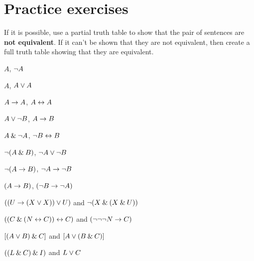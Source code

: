 
\section{Practice exercises}
\setcounter{ProbPart}{0}


\problempart
\label{pr.TT.equiv3}
If it is possible, use a partial truth table to show that the pair of sentences are \textbf{not equivalent}. If it can't be shown that they are not equivalent, then create a full truth table showing that they are equivalent. 
\begin{earg}
\item $A$, ${\neg} A$ %
\item $A$, $A \vee A$ %
\item $A\rightarrow A$, $A \leftrightarrow A$ %
\item $A \vee {\neg} B$, $A\rightarrow B$ %
\item $A \mathbin{\&} {\neg} A$, ${\neg} B \leftrightarrow B$ %
\item ${\neg}(A \mathbin{\&} B)$, ${\neg} A \vee {\neg} B$ %
\item ${\neg}(A \rightarrow B)$, ${\neg} A \rightarrow {\neg} B$ %
\item $(A \rightarrow B)$, $({\neg} B \rightarrow {\neg} A)$ %
\item $ ((U \rightarrow (X \vee X)) \vee U)$ and ${\neg} (X \mathbin{\&} (X \mathbin{\&} U))$
\item $ ((C \mathbin{\&} (N \leftrightarrow C)) \leftrightarrow C)$ and $({\neg} {\neg} {\neg} N \rightarrow C)$
\item $[(A \vee B) \mathbin{\&} C]$ and $[A \vee (B \mathbin{\&} C)]$
\item $((L \mathbin{\&} C) \mathbin{\&} I)$ and $L \vee C$
\end{earg}


